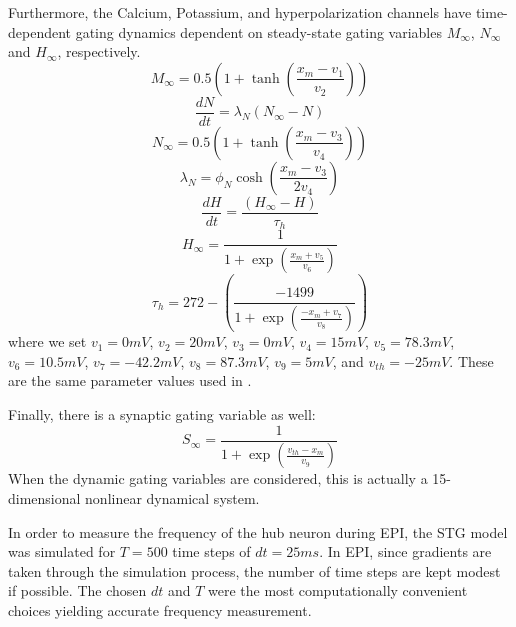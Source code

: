 \documentclass[11pt]{article}
\begin{document}
Furthermore, the Calcium, Potassium, and hyperpolarization channels have time-dependent gating dynamics dependent on steady-state gating variables $M_\infty$, $N_\infty$ and $H_\infty$, respectively.
\begin{equation}  M_{\infty} = 0.5 \left( 1 + \tanh \left( \frac{x_m - v_1}{v_2} \right) \right) \end{equation}
\begin{equation}  \frac{dN}{dt} = \lambda_N (N_\infty - N)  \end{equation}
\begin{equation}  N_\infty = 0.5 \left( 1 + \tanh \left( \frac{x_m - v_3}{v_4} \right) \right) \end{equation}
\begin{equation}  \lambda_N = \phi_N \cosh \left( \frac{x_m - v_3}{2 v_4} \right) \end{equation}
\begin{equation}  \frac{dH}{dt} = \frac{\left( H_\infty - H \right)}{\tau_h} \end{equation}
\begin{equation}  H_\infty = \frac{1}{1 + \exp \left( \frac{x_m + v_5}{v_6} \right)} \end{equation}
\begin{equation}  \tau_h = 272 - \left( \frac{-1499}{1 + \exp \left( \frac{-x_m + v_7}{v_8} \right)} \right) \end{equation}
where we set $v_1 = 0mV$, $v_2  = 20mV$, $v_3 = 0mV$, $v_4 = 15mV$, $v_5 = 78.3mV$,
$v_6 = 10.5mV$, $v_7 = -42.2mV$, $v_8 = 87.3mV$, $v_9 = 5mV$, and $v_{th} = -25mV$.  These are the same parameter values used in \cite{gutierrez2013multiple}.

Finally, there is a synaptic gating variable as well:
\begin{equation} S_\infty = \frac{1}{1 + \exp \left( \frac{v_{th} - x_m}{v_9} \right)} 
\end{equation}
When the dynamic gating variables are considered, this is actually a 15-dimensional nonlinear dynamical system.

In order to measure the frequency of the hub neuron during EPI, the STG model was simulated for $T = 500$ time steps of $dt = 25ms$.  In EPI, since gradients are taken through the simulation process, the number of time steps are kept modest if possible. The chosen $dt$ and $T$ were the most computationally convenient choices yielding accurate frequency measurement.
\end{document}
